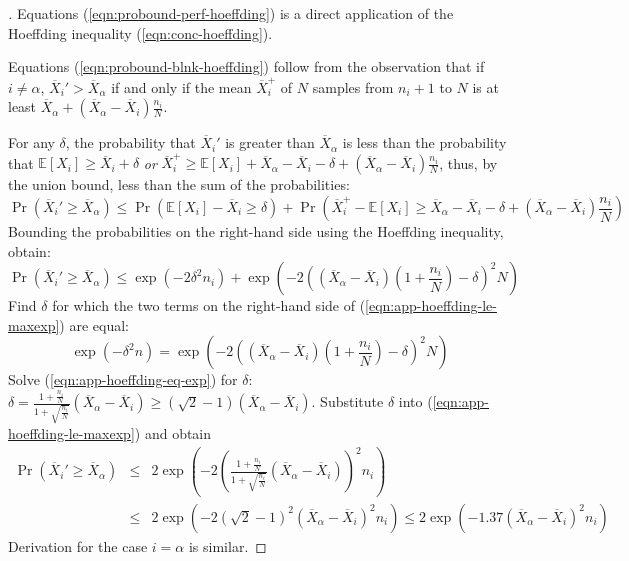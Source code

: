 \documentclass{article}
\newcommand {\IE} {\ensuremath {\mathbb{E}}}
\begin{document}
\begin{proof}[]
Equations (\ref{eqn:probound-perf-hoeffding}) is a direct
application of the Hoeffding inequality (\ref{eqn:conc-hoeffding}).

Equations (\ref{eqn:probound-blnk-hoeffding}) follow from the
observation that if $i\ne\alpha$, $\overline X_i'>\overline X_\alpha$
if and only if the mean $\overline X_i^+$ of $N$ samples from $n_i+1$
to $N$ is at least $\overline X_\alpha+(\overline X_\alpha-\overline
X_i)\frac {n_i} N$.

For any $\delta$, the probability that $\overline X_i'$ is greater
than $\overline X_\alpha$ is less than the probability that
$\IE[X_i]\ge\overline X_i+\delta$
\emph{or} $\overline X_i^+\ge \IE[X_i]+\overline X_\alpha
- \overline X_i - \delta +(\overline X_\alpha - \overline X_i)\frac {n_i} N$,
thus, by the union bound, less than the sum of the probabilities:
\begin{equation}
\Pr(\overline X_i'\ge \overline X_\alpha)\le
  \Pr(\IE[X_i]-\overline X_i \ge \delta)+
  \Pr\left(\overline X_i^+ - \IE[X_i] \ge \overline X_\alpha
           - \overline X_i - \delta +(\overline X_\alpha - \overline X_i)\frac {n_i} N\right)
\end{equation}
Bounding the probabilities on the right-hand side using the Hoeffding
inequality, obtain:
\begin{equation}
\Pr(\overline X_i'\ge \overline X_\alpha)\le 
    \exp(-2\delta^2n_i)+
         \exp\left(-2\left((\overline X_\alpha 
         - \overline X_i)\left(1+\frac {n_i} N\right)
         - \delta\right)^2N\right)
\label{eqn:app-hoeffding-le-maxexp}
\end{equation}
Find $\delta$ for which the two terms on the right-hand side of
(\ref{eqn:app-hoeffding-le-maxexp}) are equal:
\begin{equation}
\exp(-\delta^2n) = \exp(-2\left((\overline X_\alpha - \overline X_i)(1+\frac {n_i} N) - \delta\right)^2N)\label{eqn:app-hoeffding-eq-exp}
\end{equation}
Solve (\ref{eqn:app-hoeffding-eq-exp}) for $\delta$: $\delta=\frac {1+\frac {n_i} N} {1+\sqrt {\frac {n_i} N}} (\overline X_\alpha
- \overline X_i) \ge (\sqrt 2 - 1)(\overline X_\alpha-\overline X_i)$. Substitute $\delta$ into 
(\ref{eqn:app-hoeffding-le-maxexp}) and obtain
\begin{eqnarray}
\Pr(\overline X_i'\ge \overline X_\alpha) 
& \le & 2\exp\left(-2\left( \frac {1+\frac {n_i} N} {1+\sqrt {\frac {n_i} N}}
                          (\overline X_\alpha - \overline X_i)\right)^2 n_i\right)\nonumber \\
& \le & 2\exp(-2(\sqrt 2 - 1)^2(\overline X_\alpha - \overline X_i)^2n_i)
 \le 2\exp(-1.37(\overline X_\alpha - \overline X_i)^2n_i)
\end{eqnarray}
Derivation for the case $i=\alpha$ is similar.
\end{proof}
\end{document}
